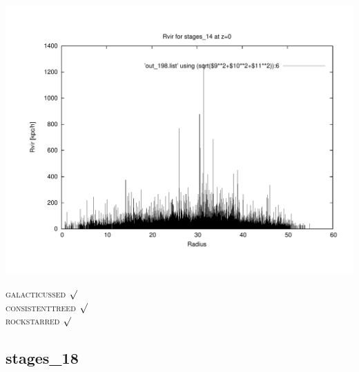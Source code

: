 \includegraphics[scale=0.3]{stages_14/plot_rvir_z0.pdf}

\textsc{galacticussed} $\surd$ \\
\textsc{consistenttreed} $\surd$ \\ 
\textsc{rockstarred} $\surd$
% 
%
%
%
%
%
%
%

\newpage
\subsection{stages\_18}

